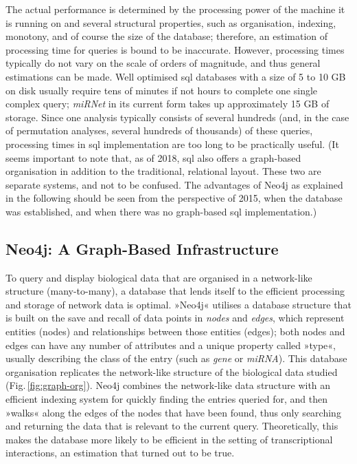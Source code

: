 The actual performance is determined by the processing power of the machine it is running on and several structural properties, such as organisation, indexing, monotony, and of course the size of the database; therefore, an estimation of processing time for queries is bound to be inaccurate. However, processing times typically do not vary on the scale of orders of magnitude, and thus general estimations can be made. Well optimised \ac{sql} databases with a size of 5 to 10 GB on disk usually require tens of minutes if not hours to complete one single complex query;\cite{Chaudhuri2004} \textit{miRNet} in its current form takes up approximately 15 GB of storage. Since one analysis typically consists of several hundreds (and, in the case of permutation analyses, several hundreds of thousands) of these queries, processing times in \ac{sql} implementation are too long to be practically useful. (It seems important to note that, as of 2018, \ac{sql} also offers a graph-based organisation in addition to the traditional, relational layout. These two are separate systems, and not to be confused. The advantages of Neo4j as explained in the following should be seen from the perspective of 2015, when the database was established, and when there was no graph-based \ac{sql} implementation.)

\subsection{Neo4j: A Graph-Based Infrastructure}
To query and display biological data that are organised in a network-like structure (many-to-many), a database that lends itself to the efficient processing and storage of network data is optimal. »Neo4j« utilises a database structure that is built on the save and recall of data points in \emph{nodes} and \emph{edges}, which represent entities (nodes) and relationships between those entities (edges); both nodes and edges can have any number of attributes and a unique property called »type«, usually describing the class of the entry (such as \emph{gene} or \emph{miRNA}). This database organisation replicates the network-like structure of the biological data studied (Fig.\,\ref{fig:graph-org}). Neo4j combines the network-like data structure with an efficient indexing system for quickly finding the entries queried for, and then »walks« along the edges of the nodes that have been found, thus only searching and returning the data that is relevant to the current query. Theoretically, this makes the database more likely to be efficient in the setting of transcriptional interactions, an estimation that turned out to be true.

